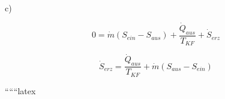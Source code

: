 c) 

\[
0 = \dot{m} (S_{ein} - S_{aus}) + \frac{\dot{Q}_{aus}}{T_{KF}} + \dot{S}_{erz}
\]

\[
\dot{S}_{erz} = \frac{\dot{Q}_{aus}}{T_{KF}} + \dot{m} (S_{aus} - S_{ein})
\]

``````latex